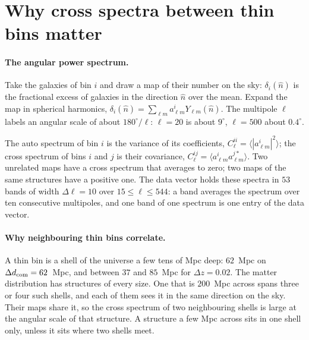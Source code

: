 \documentclass[11pt]{article}
\newcommand{\dcom}{$\Delta d_{\rm com} = 62$~Mpc}
\begin{document}
\section{Why cross spectra between thin bins matter}
\label{sec:why}

\paragraph{The angular power spectrum.}
Take the galaxies of bin $i$ and draw a map of their number on the
sky: $\delta_i(\hat{n})$ is the fractional excess of galaxies in the
direction $\hat{n}$ over the mean.  Expand the map in spherical
harmonics, $\delta_i(\hat{n}) = \sum_{\ell m} a^i_{\ell m}
Y_{\ell m}(\hat{n})$.  The multipole $\ell$ labels an angular scale of
about $180^\circ/\ell$: $\ell = 20$ is about $9^\circ$, $\ell = 500$
about $0.4^\circ$.

The auto spectrum of bin $i$ is the variance of its coefficients,
$C^{ii}_\ell = \langle |a^i_{\ell m}|^2 \rangle$; the cross spectrum of
bins $i$ and $j$ is their covariance, $C^{ij}_\ell = \langle a^i_{\ell
m} a^{j*}_{\ell m} \rangle$.  Two unrelated maps have a cross spectrum
that averages to zero; two maps of the same structures have a positive
one.  The data vector holds these spectra in $53$ bands of width
$\Delta\ell = 10$ over $15 \le \ell \le 544$: a band averages the
spectrum over ten consecutive multipoles, and one band of one
spectrum is one entry of the data vector.

\paragraph{Why neighbouring thin bins correlate.}
A thin bin is a shell of the universe a few tens of Mpc deep: $62$~Mpc
on \dcom{}, and between $37$ and $85$~Mpc for $\Delta z = 0.02$.  The
matter distribution has structures of every size.  One that is
$200$~Mpc across spans three or four such shells, and each of them sees
it in the same direction on the sky.  Their maps share it, so the cross
spectrum of two neighbouring shells is large at the angular scale of
that structure.  A structure a few Mpc across sits in one shell only,
unless it sits where two shells meet.
\end{document}
